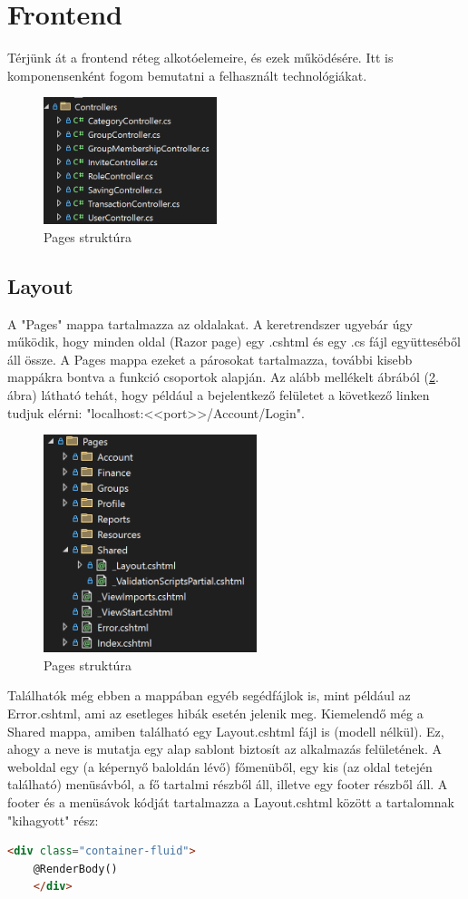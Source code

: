 \section{Frontend}
Térjünk át a frontend réteg alkotóelemeire, és ezek működésére. Itt is komponensenként fogom bemutatni a felhasznált technológiákat.
\begin{figure}[H]
	\centering
	\includegraphics[height=140px]{img/controllers}
	\caption{Pages struktúra}
	\label{fig:controllers}
\end{figure}
\subsection{Layout}
A "Pages" mappa tartalmazza az oldalakat. A keretrendszer ugyebár úgy működik, hogy minden oldal (Razor page) egy .cshtml és egy .cs
fájl együtteséből áll össze. A Pages mappa ezeket a párosokat tartalmazza, további kisebb mappákra bontva a funkció csoportok alapján. Az alább mellékelt ábrából (\ref{fig:pages-structure}. ábra) látható tehát, hogy például a bejelentkező felületet a következő linken tudjuk elérni: "localhost:<<port>>/Account/Login".

\begin{figure}[H]
	\centering
	\includegraphics[height=240px]{img/solution-explorer-pages-screenshot}
	\caption{Pages struktúra}
	\label{fig:pages-structure}
\end{figure}

Találhatók még ebben a mappában egyéb segédfájlok is, mint például az Error.cshtml, ami az esetleges hibák esetén jelenik meg. Kiemelendő még a Shared mappa, amiben található egy Layout.cshtml fájl is (modell nélkül). Ez, ahogy a neve is mutatja egy alap sablont biztosít az alkalmazás felületének. A weboldal egy (a képernyő baloldán lévő) főmenüből, egy kis (az oldal tetején található) menüsávból, a fő tartalmi részből áll, illetve egy footer részből áll. A footer és a menüsávok kódját tartalmazza a Layout.cshtml között a tartalomnak "kihagyott" rész: 
\begin{lstlisting}[language={HTML}]
	<div class="container-fluid">
	@RenderBody()
	</div>
\end{lstlisting}

